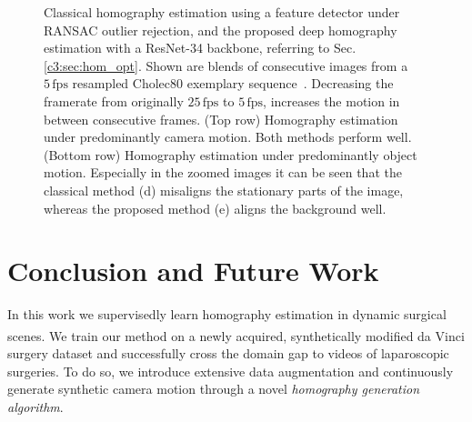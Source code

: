\begin{figure}[tb]
    \caption{Classical homography estimation using a  feature detector under RANSAC outlier rejection, and the proposed deep homography estimation with a ResNet-34 backbone, referring to Sec.\,\ref{c3:sec:hom_opt}. Shown are blends of consecutive images from a $5\,\text{fps}$ resampled Cholec80 exemplary sequence~\cite{twinanda2016endonet}. Decreasing the framerate from originally $25\,\text{fps}$ to $5\,\text{fps}$, increases the motion in between consecutive frames. (Top row) Homography estimation under predominantly camera motion. Both methods perform well. (Bottom row) Homography estimation under predominantly object motion. Especially in the zoomed images it can be seen that the classical method (d) misaligns the stationary parts of the image, whereas the proposed method (e) aligns the background well.}
    \label{c3:fig:qualitative}
\end{figure}



\section{Conclusion and Future Work}

In this work we supervisedly learn homography estimation in dynamic surgical scenes. We train our method on a newly acquired, synthetically modified da Vinci\textsuperscript{\textregistered} surgery dataset and successfully cross the domain gap to videos of laparoscopic surgeries. To do so, we introduce extensive data augmentation and continuously generate synthetic camera motion through a novel \textit{homography generation algorithm}.

